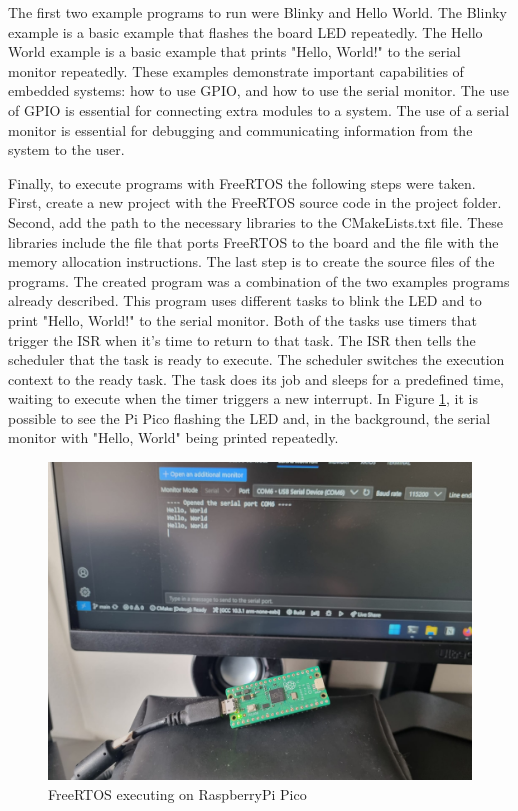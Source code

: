The first two example programs to run were Blinky and Hello World. The Blinky example is a basic example that flashes the board LED repeatedly. The Hello World example is a basic example that prints "Hello, World!" to the serial monitor repeatedly. These examples demonstrate important capabilities of embedded systems: how to use GPIO, and how to use the serial monitor. The use of GPIO is essential for connecting extra modules to a system. The use of a serial monitor is essential for debugging and communicating information from the system to the user.

Finally, to execute programs with FreeRTOS the following steps were taken. First, create a new project with the FreeRTOS source code in the project folder. Second, add the path to the necessary libraries to the CMakeLists.txt file. These libraries include the file that ports FreeRTOS to the board and the file with the memory allocation instructions. The last step is to create the source files of the programs. The created program was a combination of the two examples programs already described. This program uses different tasks to blink the LED and to print "Hello, World!" to the serial monitor. Both of the tasks use timers that trigger the ISR when it's time to return to that task. The ISR then tells the scheduler that the task is ready to execute. The scheduler switches the execution context to the ready task. The task does its job and sleeps for a predefined time, waiting to execute when the timer triggers a new interrupt. In Figure \ref{fig:pico}, it is possible to see the Pi Pico flashing the LED and, in the background, the serial monitor with "Hello, World" being printed repeatedly.

\begin{figure}[ht]
    \centering
    \includegraphics[scale=0.15]{Figures/pico-multitasking.jpeg}
    \caption{FreeRTOS executing on RaspberryPi Pico}
    \label{fig:pico}
\end{figure}

